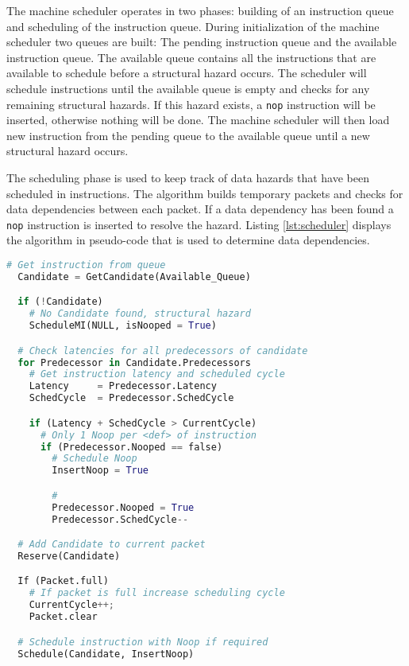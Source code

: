 The machine scheduler operates in two phases: building of an instruction queue and scheduling of the instruction queue.
During initialization of the machine scheduler two queues are built: The pending instruction queue and the available instruction queue. The available queue contains all the instructions that are available to schedule before a structural hazard occurs. The scheduler will schedule instructions until the available queue is empty and checks for any remaining structural hazards. If this hazard exists, a \texttt{nop} instruction will be inserted, otherwise nothing will be done. The machine scheduler will then load new instruction from the pending queue to the available queue until a new structural hazard occurs.

The scheduling phase is used to keep track of data hazards that have been scheduled in instructions. The algorithm builds temporary packets and checks for data dependencies between each packet. If a data dependency has been found a \texttt{nop} instruction is inserted to resolve the hazard. Listing \ref{lst:scheduler} displays the algorithm in pseudo-code that is used to determine data dependencies. 


\begin{lstlisting}[language=python,label=lst:scheduler]
  # Get instruction from queue
  Candidate = GetCandidate(Available_Queue)

  if (!Candidate)
    # No Candidate found, structural hazard
    ScheduleMI(NULL, isNooped = True)

  # Check latencies for all predecessors of candidate
  for Predecessor in Candidate.Predecessors
    # Get instruction latency and scheduled cycle
    Latency     = Predecessor.Latency
    SchedCycle  = Predecessor.SchedCycle   

    if (Latency + SchedCycle > CurrentCycle)
      # Only 1 Noop per <def> of instruction
      if (Predecessor.Nooped == false)
        # Schedule Noop
        InsertNoop = True

        #                   
        Predecessor.Nooped = True
        Predecessor.SchedCycle--          

  # Add Candidate to current packet
  Reserve(Candidate)                       

  If (Packet.full)
    # If packet is full increase scheduling cycle
    CurrentCycle++;                        
    Packet.clear                           

  # Schedule instruction with Noop if required     
  Schedule(Candidate, InsertNoop)           

\end{lstlisting}

